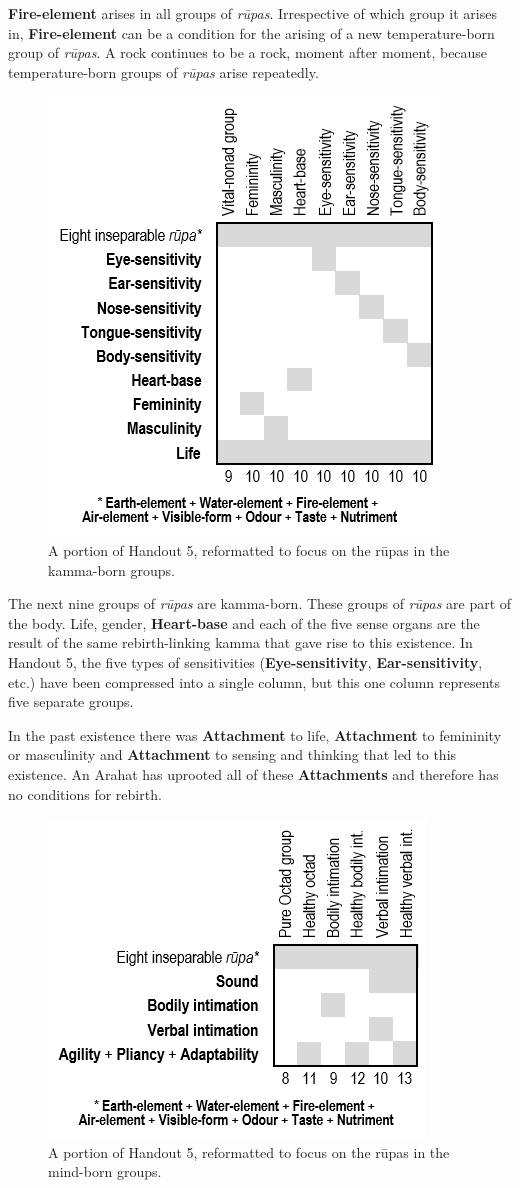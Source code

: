 \textbf{Fire-element} arises in all groups of \textit{rūpas}. Irrespective of which group it arises in, \textbf{Fire-element} can be a condition for the arising of a new temperature-born group of \textit{rūpas}. A rock continues to be a rock, moment after moment, because temperature-born groups of \textit{rūpas} arise repeatedly.

\begin{figure}[h]
\centering

\includegraphics[width=0.5\linewidth]{./Diagrams/KammaG}
\caption{A portion of Handout 5, reformatted to focus on the rūpas in the kamma-born groups.}
\label{fig:KammaG}
\end{figure}

The next nine groups of \textit{rūpas} are kamma-born. These groups of \textit{rūpas} are part of the body. Life, gender, \textbf{Heart-base} and each of the five sense organs are the result of the same rebirth-linking kamma that gave rise to this existence. In Handout 5, the five types of sensitivities (\textbf{Eye-sensitivity}, \textbf{Ear-sensitivity}, etc.) have been compressed into a single column, but this one column represents five separate groups.

In the past existence there was \textbf{Attachment} to life, \textbf{Attachment} to femininity or masculinity and \textbf{Attachment} to sensing and thinking that led to this existence. An Arahat has uprooted all of these \textbf{Attachments} and therefore has no conditions for rebirth.

\begin{figure}[h]
\centering
\includegraphics[width=0.5\linewidth]{./Diagrams/MindG}
\caption{A portion of Handout 5, reformatted to focus on the rūpas in the mind-born groups.}
\label{fig:MindG}
\end{figure}

